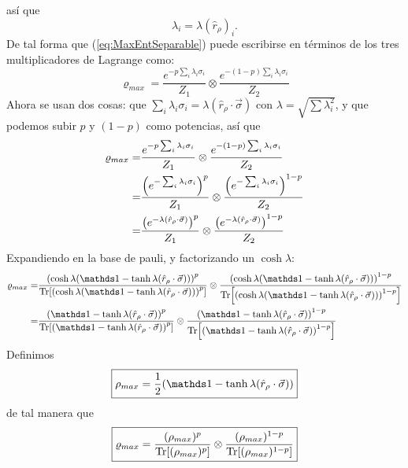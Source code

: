 así que
\begin{equation*}
  \lambda_{i}=\lambda(\hat{r}_{\rho})_{i}.
\end{equation*}
De tal forma que (\ref{eq:MaxEntSeparable}) puede escribirse en términos de los tres multiplicadores de Lagrange como:
\begin{equation*}
\varrho_{max}=\frac{e^{-p\sum_{i}\lambda_{i}\sigma_{i}}}{Z_{1}} \otimes \frac{e^{-(1-p)\sum_{i}\lambda_{i}\sigma_{i}}}{Z_{2}}
\end{equation*}
Ahora se usan dos cosas: que $\sum_{i}\lambda_{i}\sigma_{i}=\lambda(\hat{r}_{\rho}\cdot\vec{\sigma})$ con $\lambda=\sqrt{\sum \lambda_{i}^{2}}$, y que podemos subir $p$ y $(1-p)$ como potencias, así que
\begin{align*}
  \varrho_{max}=&\frac{e^{-p\sum_{i}\lambda_{i}\sigma_{i}}}{Z_{1}} \otimes \frac{e^{-(1-p)\sum_{i}\lambda_{i}\sigma_{i}}}{Z_{2}}\\
  =&\frac{\qty(e^{-\sum_{i}\lambda_{i}\sigma_{i}})^{p} }{Z_{1}}\otimes \frac{\qty(e^{-\sum_{i}\lambda_{i}\sigma_{i}})^{1-p}}{Z_{2}}\\
  =&\frac{\qty(e^{-\lambda(\hat{r}_{\rho}\cdot\vec{\sigma})})^{p}}{Z_{1}} \otimes \frac{\qty(e^{-\lambda(\hat{r}_{\rho}\cdot\vec{\sigma})})^{1-p}}{Z_{2}}\\
\end{align*}
Expandiendo en la base de pauli, y factorizando un $\cosh{\lambda}$:
\begin{align*}
  \varrho_{max}=&\frac{\qty(\cosh{\lambda}(\Id-\tanh{\lambda}(\hat{r}_{\rho}\cdot\vec{\sigma})))^{p}}{\Tr[\qty(\cosh{\lambda}(\Id-\tanh{\lambda}(\hat{r}_{\rho}\cdot\vec{\sigma})))^{p}]} \otimes \frac{\qty(\cosh{\lambda}(\Id-\tanh{\lambda}(\hat{r}_{\rho}\cdot\vec{\sigma})))^{1-p}}{\Tr[\qty(\cosh{\lambda}(\Id-\tanh{\lambda}(\hat{r}_{\rho}\cdot\vec{\sigma})))^{1-p}]}\\
  =&\frac{\qty(\Id-\tanh{\lambda}(\hat{r}_{\rho}\cdot\vec{\sigma}))^{p}}{\Tr[\qty(\Id-\tanh{\lambda}(\hat{r}_{\rho}\cdot\vec{\sigma}))^{p}]} \otimes \frac{\qty(\Id-\tanh{\lambda}(\hat{r}_{\rho}\cdot\vec{\sigma}))^{1-p}}{\Tr[\qty(\Id-\tanh{\lambda}(\hat{r}_{\rho}\cdot\vec{\sigma}))^{1-p}]}
\end{align*}
Definimos
\begin{equation}
  \boxed{\rho_{max}=\frac{1}{2}(\Id-\tanh{\lambda}(\hat{r}_{\rho}\cdot\vec{\sigma}))}
\end{equation}
de tal manera que 
\begin{equation}\label{eq:MaxEntSeparableLM}
  \boxed{\varrho_{max}=\frac{(\rho_{max})^{p}}{\Tr[ (\rho_{max})^{p}]}\otimes\frac{(\rho_{max})^{1-p}}{\Tr[(\rho_{max})^{1-p}]}}
\end{equation}
